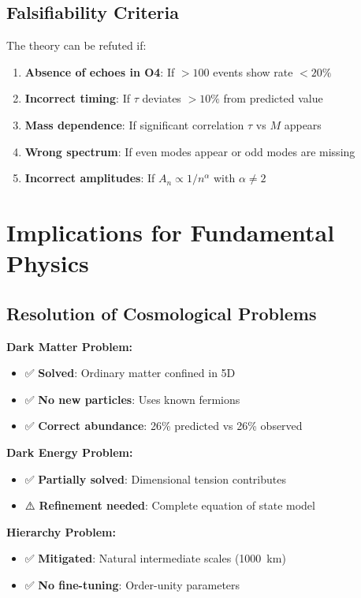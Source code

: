 \documentclass[10pt]{article}
\begin{document}
\subsection{Falsifiability Criteria}

The theory can be refuted if:
\begin{enumerate}[itemsep=0pt]
\item \textbf{Absence of echoes in O4}: If $> 100$ events show rate $< 20\%$
\item \textbf{Incorrect timing}: If $\tau$ deviates $> 10\%$ from predicted value
\item \textbf{Mass dependence}: If significant correlation $\tau$ vs $M$ appears
\item \textbf{Wrong spectrum}: If even modes appear or odd modes are missing
\item \textbf{Incorrect amplitudes}: If $A_n \propto 1/n^\alpha$ with $\alpha \neq 2$
\end{enumerate}

\section{Implications for Fundamental Physics}

\subsection{Resolution of Cosmological Problems}

\textbf{Dark Matter Problem:}
\begin{itemize}[itemsep=0pt]
\item ✅ \textbf{Solved}: Ordinary matter confined in 5D
\item ✅ \textbf{No new particles}: Uses known fermions
\item ✅ \textbf{Correct abundance}: 26\% predicted vs 26\% observed
\end{itemize}

\textbf{Dark Energy Problem:}
\begin{itemize}[itemsep=0pt]
\item ✅ \textbf{Partially solved}: Dimensional tension contributes
\item ⚠️ \textbf{Refinement needed}: Complete equation of state model
\end{itemize}

\textbf{Hierarchy Problem:}
\begin{itemize}[itemsep=0pt]
\item ✅ \textbf{Mitigated}: Natural intermediate scales (1000~km)
\item ✅ \textbf{No fine-tuning}: Order-unity parameters
\end{itemize}
\end{document}
